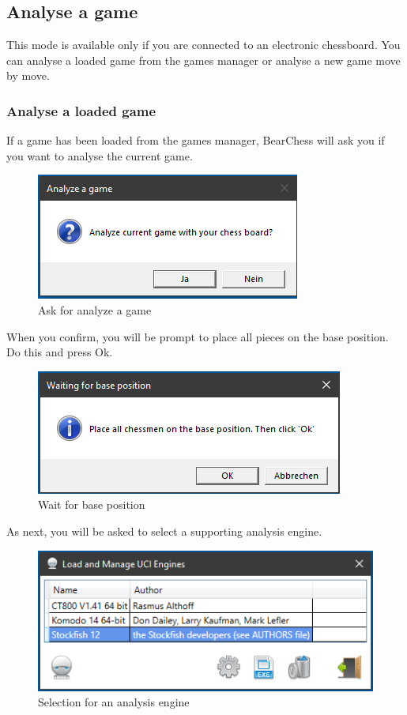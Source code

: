 \documentclass[11pt,a4paper]{article}
\begin{document}
\subsection{Analyse a game} \label{AnalyzeMode2}

This mode is available only if you are connected to an electronic chessboard.
You can analyse a loaded game from the games manager or analyse a new game move by move.

\subsubsection{Analyse a loaded game} \label{AnalyzeMode21}
If a game has been loaded from the games manager, BearChess will ask you if you want to analyse the current game.\\
\begin{figure}[H]
	\centering
	\includegraphics[scale=1.0]{AnalyzeGame1.png}
	\caption{Ask for analyze a game}
	\label{fig:AnalyzeGame1}
\end{figure}

When you confirm, you will be prompt to place all pieces on the base position. Do this and press Ok.
\begin{figure}[H]
	\centering
	\includegraphics[scale=1.0]{AnalyzeGame2.png}
	\caption{Wait for base position}
	\label{fig:AnalyzeGame2}
\end{figure}
As next, you will be asked to select a supporting analysis engine.

\begin{figure}[H]
	\centering
	\includegraphics[scale=0.9]{AnalyzeMode2.png}
	\caption{Selection for an analysis engine}
	\label{fig:AnalyzeMode2_3}
\end{figure}
\end{document}

